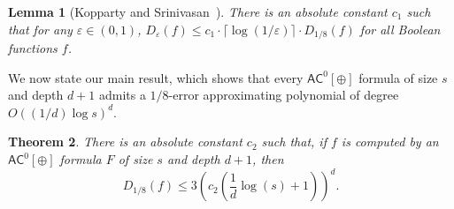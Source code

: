 \documentclass[11pt]{article}
\numberwithin{equation}{section}
\newtheorem{theorem}{Theorem}[section]
\newtheorem{lemma}[theorem]{Lemma}
\theoremstyle{definition}
\theoremstyle{plain}
\newcommand{\cclass}[1]{\textsf{#1}}
\newcommand{\eps}{\varepsilon}
\newcommand{\AC}{\cclass{AC}}
\begin{document}
\begin{lemma}[Kopparty and Srinivasan~\cite{kopparty2012certifying}]\label{la:eps}
There is an absolute constant $c_1$ such that for any $\varepsilon \in (0,1)$, $D_\eps(f) \le c_1\cdot\lceil \log(1/\eps)\rceil \cdot D_{1/8}(f)$ for all Boolean functions $f$.
\end{lemma}

We now state our main result, which shows that every $\AC^0[\oplus]$ formula of size $s$ and depth $d + 1$ admits a $1/8$-error approximating polynomial of degree $O((1/d)\log s)^d$.

\begin{theorem}
  There is an absolute constant $c_2$ such that, if $f$ is computed by an $\AC^0[\oplus]$ formula $F$ of size $s$ and depth $d+1$, then
  \[
    D_{1/8}(f) \le 3\left(c_2\left(\frac{1}{d}\log(s)+1\right)\right)^d.
  \]
\end{theorem}
\end{document}
